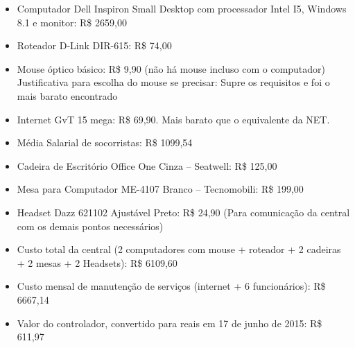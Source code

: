 \begin{itemize}
 

 \item Computador Dell Inspiron Small Desktop com processador Intel I5, Windows 8.1 e monitor: R\$ 2659,00  \footnotemark
{}

  \item Roteador D-Link DIR-615: R\$ 74,00

  \item Mouse óptico básico: R\$ 9,90 (não há mouse incluso com o computador) \footnotemark
    \subitem *Justificativa para escolha do mouse se precisar: Supre os requisitos e foi o mais barato encontrado

  \item Internet GvT 15 mega: R\$ 69,90. \footnotemark
    \subitem *Mais barato que o equivalente da NET.

  \item Média Salarial de socorristas: R\$ 1099,54 \footnotemark

  \item Cadeira de Escritório Office One Cinza – Seatwell: R\$ 125,00 \footnotemark

  \item Mesa para Computador ME-4107 Branco – Tecnomobili: R\$ 199,00 \footnotemark

  \item Headset Dazz 621102 Ajustável Preto: R\$ 24,90 \footnotemark
    \subitem(Para comunicação da central com os demais pontos necessários)

  \item Custo total da central (2 computadores com mouse + roteador + 2 cadeiras + 2 mesas + 2 Headsets): R\$ 6109,60
  \item Custo mensal de manutenção de serviços (internet + 6 funcionários): R\$ 6667,14

\end{itemize}



\begin{itemize}
  \item Valor do controlador, convertido para reais em 17 de junho de 2015: R\$ 611,97 
\end{itemize}
